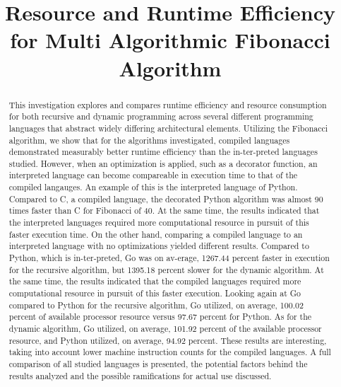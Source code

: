 \documentclass{sig-alternate}
\title{Resource and Runtime Efficiency for Multi Algorithmic Fibonacci Algorithm}
\author{}
\begin{document}
\maketitle
\thispagestyle{firstpage}
\pagestyle{plain}




\begin{abstract}

This investigation explores and compares runtime efficiency and resource consumption 
for both recursive and dynamic programming across several different programming languages that abstract widely differing architectural elements. Utilizing the Fibonacci algorithm, we show that for the algorithms investigated, compiled languages demonstrated measurably better runtime efficiency than the in-ter-preted languages studied. However, when an optimization is applied, such as a decorator function, an interpreted language can become compareable in execution time to that of the compiled langauges. An example of this is the interpreted language of Python. Compared to C, a compiled language, the decorated Python algorithm was almost 90 times faster than C for Fibonacci of 40. At the same time, the results indicated that the interpreted languages required more computational resource in pursuit of this faster execution time. On the other hand, comparing a compiled language to an interpreted language with no optimizations yielded different results. Compared to Python, which is in-ter-preted, Go was on av-erage, 1267.44 percent faster in execution for the recursive algorithm, but 1395.18 percent slower for the dynamic algorithm. At the same time, the results indicated that the compiled languages required more computational resource in pursuit of this faster execution. Looking again at Go compared to Python for the recursive algorithm, Go utilized, on average, 100.02 percent of available processor resource versus 97.67 percent for Python. As for the dynamic algorithm, Go utilized, on average, 101.92 percent of the available processor resource, and Python utilized, on average, 94.92 percent. These results are interesting, taking into account lower machine instruction counts for the compiled languages. A full comparison of all studied languages is presented, the potential factors behind the results analyzed and the possible ramifications for actual use discussed.

\end{abstract}
\end{document}
